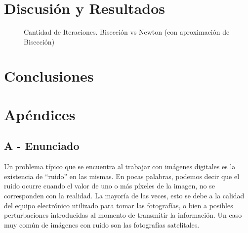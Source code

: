 \documentclass[a4paper]{article}
\begin{document}
\section{Discusión y Resultados}


\begin{figure}[H]
  \centering
  \caption{Cantidad de Iteraciones. Bisección vs Newton (con aproximación de Bisección) }
\end{figure}



\newpage

\section{Conclusiones}


\newpage

\section{Apéndices}

\subsection{A - Enunciado}

Un problema t\'ipico que se encuentra al trabajar con im\'agenes digitales es la existencia de ``ruido'' en las mismas. En pocas palabras, podemos decir que el ruido ocurre cuando el valor de uno o m\'as p\'ixeles de la imagen, no se corresponden con la realidad. La mayor\'ia de las veces, esto se debe a la calidad del equipo electr\'onico utilizado para tomar las fotograf\'ias, o bien a posibles perturbaciones introducidas al momento de transmitir la informaci\'on. Un caso muy com\'un de im\'agenes con ruido son las fotograf\'ias satelitales.
\end{document}
